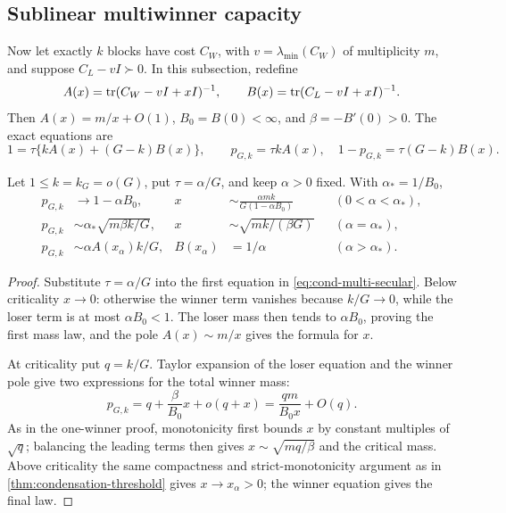 \subsection{Sublinear multiwinner capacity}
\label{sec:condensation-multiwinner}

Now let exactly $k$ blocks have cost $C_W$, with
$v=\lambda_{\min}(C_W)$ of multiplicity $m$, and suppose
$C_L-vI\succ0$.  In this subsection, redefine
\begin{equation}
 A(x)=\operatorname{tr}(C_W-vI+xI)^{-1},\qquad
 B(x)=\operatorname{tr}(C_L-vI+xI)^{-1}.                              \label{eq:cond-multi-resolvents}
\end{equation}
Then $A(x)=m/x+O(1)$,
$B_0=B(0)<\infty$, and $\beta=-B'(0)>0$.  The exact equations are
\begin{equation}
 1=\tau\{kA(x)+(G-k)B(x)\},\qquad
 p_{G,k}=\tau kA(x),\quad1-p_{G,k}=\tau(G-k)B(x).         \label{eq:cond-multi-secular}
\end{equation}

\begin{theorem}
\label{thm:cond-multiwinner}
Let $1\le k=k_G=o(G)$, put $\tau=\alpha/G$, and keep $\alpha>0$ fixed.
With $\alpha_*=1/B_0$,
\begin{align}
 p_{G,k}&\longrightarrow1-\alpha B_0,
 &x&\sim\frac{\alpha m k}{G(1-\alpha B_0)}
 &&(0<\alpha<\alpha_*),                                  \label{eq:cond-multi-subcritical}\\
 p_{G,k}&\sim\alpha_*\sqrt{m\beta k/G},
 &x&\sim\sqrt{mk/(\beta G)}
 &&(\alpha=\alpha_*),                                    \label{eq:cond-multi-critical}\\
 p_{G,k}&\sim\alpha A(x_\alpha)k/G,
 &B(x_\alpha)&=1/\alpha
 &&(\alpha>\alpha_*).                                    \label{eq:cond-multi-supercritical}
\end{align}
\end{theorem}

\begin{proof}
Substitute $\tau=\alpha/G$ into the first equation in
\eqref{eq:cond-multi-secular}.  Below criticality $x\to0$: otherwise the
winner term vanishes because $k/G\to0$, while the loser term is at most
$\alpha B_0<1$.  The loser mass then tends to $\alpha B_0$, proving the
first mass law, and the pole $A(x)\sim m/x$ gives the formula for $x$.

At criticality put $q=k/G$.  Taylor expansion of the loser equation and the
winner pole give two expressions for the total winner mass:
\begin{equation}
 p_{G,k}=q+\frac{\beta}{B_0}x+o(q+x)
       =\frac{qm}{B_0x}+O(q).                            \label{eq:cond-multi-balance}
\end{equation}
As in the one-winner proof, monotonicity first bounds $x$ by constant
multiples of $\sqrt q$; balancing the leading terms then gives
$x\sim\sqrt{mq/\beta}$ and the critical mass.  Above criticality the same
compactness and strict-monotonicity argument as in
\cref{thm:condensation-threshold} gives $x\to x_\alpha>0$; the winner
equation gives the final law.
\end{proof}

